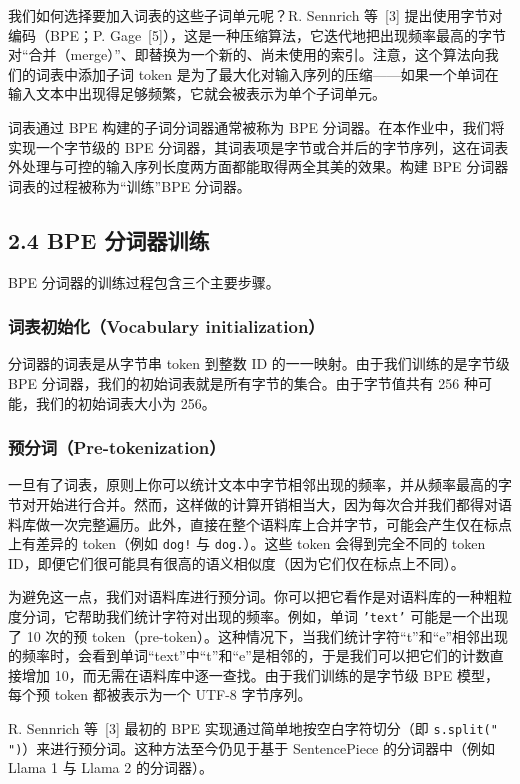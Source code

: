 我们如何选择要加入词表的这些子词单元呢？R. Sennrich 等 \,[3] 提出使用字节对编码（BPE；P. Gage \,[5]），这是一种压缩算法，它迭代地把出现频率最高的字节对“合并（merge）”、即替换为一个新的、尚未使用的索引。注意，这个算法向我们的词表中添加子词 token 是为了最大化对输入序列的压缩——如果一个单词在输入文本中出现得足够频繁，它就会被表示为单个子词单元。

词表通过 BPE 构建的子词分词器通常被称为 BPE 分词器。在本作业中，我们将实现一个字节级的 BPE 分词器，其词表项是字节或合并后的字节序列，这在词表外处理与可控的输入序列长度两方面都能取得两全其美的效果。构建 BPE 分词器词表的过程被称为“训练”BPE 分词器。

\subsection*{2.4 BPE 分词器训练}

BPE 分词器的训练过程包含三个主要步骤。

\subsubsection*{词表初始化（Vocabulary initialization）}

分词器的词表是从字节串 token 到整数 ID 的一一映射。由于我们训练的是字节级 BPE 分词器，我们的初始词表就是所有字节的集合。由于字节值共有 256 种可能，我们的初始词表大小为 256。

\subsubsection*{预分词（Pre-tokenization）}

一旦有了词表，原则上你可以统计文本中字节相邻出现的频率，并从频率最高的字节对开始进行合并。然而，这样做的计算开销相当大，因为每次合并我们都得对语料库做一次完整遍历。此外，直接在整个语料库上合并字节，可能会产生仅在标点上有差异的 token（例如 \texttt{dog!} 与 \texttt{dog.}）。这些 token 会得到完全不同的 token ID，即便它们很可能具有很高的语义相似度（因为它们仅在标点上不同）。

为避免这一点，我们对语料库进行预分词。你可以把它看作是对语料库的一种粗粒度分词，它帮助我们统计字符对出现的频率。例如，单词 \texttt{'text'} 可能是一个出现了 10 次的预 token（pre-token）。这种情况下，当我们统计字符“t”和“e”相邻出现的频率时，会看到单词“text”中“t”和“e”是相邻的，于是我们可以把它们的计数直接增加 10，而无需在语料库中逐一查找。由于我们训练的是字节级 BPE 模型，每个预 token 都被表示为一个 UTF-8 字节序列。

R. Sennrich 等 \,[3] 最初的 BPE 实现通过简单地按空白字符切分（即 \texttt{s.split(" ")}）来进行预分词。这种方法至今仍见于基于 SentencePiece 的分词器中（例如 Llama 1 与 Llama 2 的分词器）。


